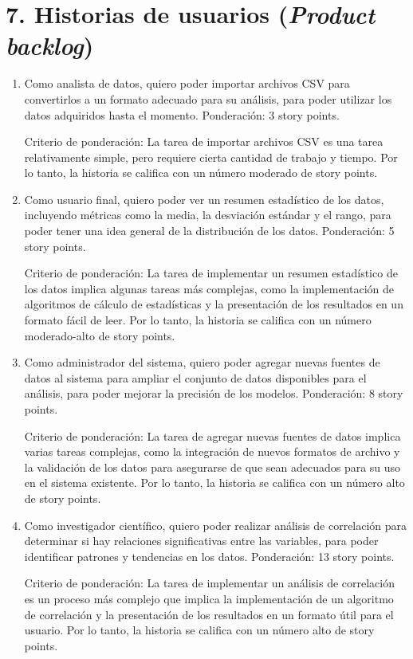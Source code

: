 \documentclass[
11pt, %
codirector, %
]{charter}
\begin{document}
\section{7. Historias de usuarios (\textit{Product backlog})}
\label{sec:backlog}
\begin{enumerate}
\item Como analista de datos, quiero poder importar archivos CSV para convertirlos a un formato adecuado para su análisis, para poder utilizar los datos adquiridos hasta el momento. Ponderación: 3 story points.

Criterio de ponderación: La tarea de importar archivos CSV es una tarea relativamente simple, pero requiere cierta cantidad de trabajo y tiempo. Por lo tanto, la historia se califica con un número moderado de story points.

\item Como usuario final, quiero poder ver un resumen estadístico de los datos, incluyendo métricas como la media, la desviación estándar y el rango, para poder tener una idea general de la distribución de los datos. Ponderación: 5 story points.

Criterio de ponderación: La tarea de implementar un resumen estadístico de los datos implica algunas tareas más complejas, como la implementación de algoritmos de cálculo de estadísticas y la presentación de los resultados en un formato fácil de leer. Por lo tanto, la historia se califica con un número moderado-alto de story points.

\item Como administrador del sistema, quiero poder agregar nuevas fuentes de datos al sistema para ampliar el conjunto de datos disponibles para el análisis, para poder mejorar la precisión de los modelos. Ponderación: 8 story points.

Criterio de ponderación: La tarea de agregar nuevas fuentes de datos implica varias tareas complejas, como la integración de nuevos formatos de archivo y la validación de los datos para asegurarse de que sean adecuados para su uso en el sistema existente. Por lo tanto, la historia se califica con un número alto de story points.

\item Como investigador científico, quiero poder realizar análisis de correlación para determinar si hay relaciones significativas entre las variables, para poder identificar patrones y tendencias en los datos. Ponderación: 13 story points.

Criterio de ponderación: La tarea de implementar un análisis de correlación es un proceso más complejo que implica la implementación de un algoritmo de correlación y la presentación de los resultados en un formato útil para el usuario. Por lo tanto, la historia se califica con un número alto de story points.
\end{enumerate}
\end{document}
